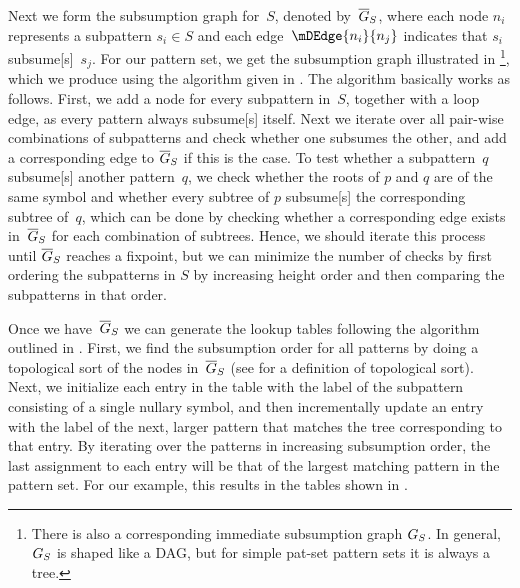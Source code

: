 {Next we form the \gls{subsumption graph} for~$S$, denoted by~$\overline{G}_S$, where each
\gls{node} $n_i$ represents a \gls{subpattern} \mbox{$s_i \in S$} and each
\gls{edge}~\mbox{$\mDEdge{n_i}{n_j}$} indicates that $s_i$
\gls{subsume}[s]~$s_j$.
%
For our \gls{pattern set}, we get the \gls{subsumption
  graph} illustrated in
\footnote{There is also a
  corresponding \gls{immediate subsumption graph} $G_S$.
%
In general,
  $G_S$ is shaped like a \glsdesc{DAG}, but for \gls{simple pat-set}
  \glspl{pattern set} it is always a \gls{tree}.}, which we produce using the
algorithm given in .
%
The
algorithm basically works as follows.
%
First, we add a \gls{node} for every
\gls{subpattern} in~$S$, together with a \gls{loop edge}, as every \gls{pattern}
always \gls{subsume}[s] itself.
%
Next we iterate over all pair-wise combinations
of \glspl{subpattern} and check whether one subsumes the other, and add a
corresponding edge to $\overline{G}_S$ if this is the case.
%
To test whether a
\gls{subpattern}~$q$ \gls{subsume}[s] another \gls{pattern}~$q$, we check
whether the \glspl{root} of $p$ and $q$ are of the same \gls{symbol} and whether
every \gls{subtree} of $p$ \gls{subsume}[s] the corresponding \gls{subtree}
of~$q$, which can be done by checking whether a corresponding edge exists
in~$\overline{G}_S$ for each combination of \glspl{subtree}.
%
Hence, we should iterate this
process until $\overline{G}_S$ reaches a fixpoint, but we can minimize the number of
checks by first ordering the \glspl{subpattern} in $S$ by increasing height
order and then comparing the \glspl{subpattern} in that order.

Once we have~$\overline{G}_S$ we can generate the lookup tables following the algorithm
outlined in .
%
First, we find
the \gls{subsumption order} for all \glspl{pattern} by doing a \gls{topological
  sort} of the \glspl{node} in~$\overline{G}_S$ (see  for a
definition of \gls{topological sort}).
%
Next, we initialize each entry in the
table with the label of the \gls{subpattern} consisting of a single \gls{nullary
  symbol}, and then incrementally update an entry with the label of the next,
larger \gls{pattern} that matches the \gls{tree} corresponding to that entry.
%
By
iterating over the \glspl{pattern} in increasing \gls{subsumption order}, the
last assignment to each entry will be that of the largest matching \gls{pattern}
in the \gls{pattern set}.
%
For our example, this results in the tables shown in
.


}
